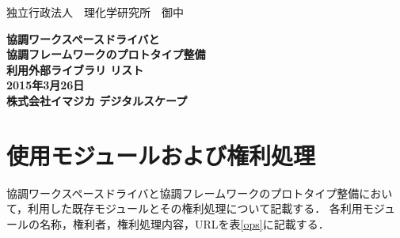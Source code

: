 \documentclass[a4paper,10pt,oneside]{jsbook}
\begin{document}
\begin{titlepage}
\noindent
独立行政法人　理化学研究所　御中
\begin{center}
	\vspace{8cm}
	{\Huge \textbf{協調ワークスペースドライバと\\協調フレームワークのプロトタイプ整備} } \\
	\vspace{1cm}
	{\Huge \textbf{利用外部ライブラリ リスト}} \\
	\vspace{10cm}
	{\Large \textbf{2015年3月26日}} \\
	\vspace{0.5cm}
	{\Large \textbf{株式会社イマジカ デジタルスケープ}}
\end{center}
\end{titlepage}

\tableofcontents

\chapter{使用モジュールおよび権利処理}
協調ワークスペースドライバと協調フレームワークのプロトタイプ整備において，利用した既存モジュールとその権利処理について記載する．
各利用モジュールの名称，権利者，権利処理内容，URLを表\ref{ops}に記載する．
\end{document}

